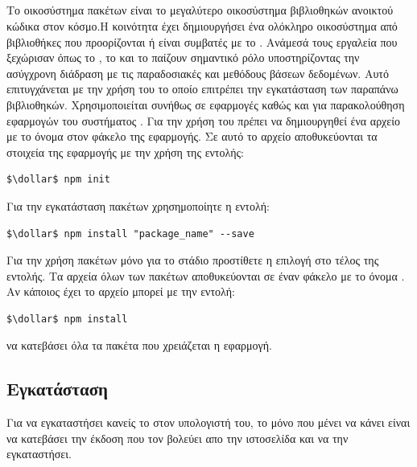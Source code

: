 \subsection*{}
\pSpace Το οικοσύστημα πακέτων  είναι το μεγαλύτερο οικοσύστημα βιβλιοθηκών ανοικτού κώδικα στον κόσμο.Η κοινότητα έχει δημιουργήσει ένα ολόκληρο οικοσύστημα από βιβλιοθήκες που προορίζονται ή είναι συμβατές με το . Ανάμεσά τους εργαλεία που ξεχώρισαν όπως το , το  και το  παίζουν σημαντικό ρόλο υποστηρίζοντας την ασύγχρονη διάδραση με τις παραδοσιακές και  μεθόδους βάσεων δεδομένων. Αυτό επιτυγχάνεται με την χρήση του  το οποίο επιτρέπει την εγκατάσταση των παραπάνω βιβλιοθηκών. Χρησιμοποιείται συνήθως σε εφαρμογές  καθώς και για παρακολούθηση εφαρμογών του συστήματος 
. Για την χρήση του  πρέπει να δημιουργηθεί ένα αρχείο με το όνομα  στον φάκελο της εφαρμογής. Σε αυτό το αρχείο αποθυκεύονται τα στοιχεία της εφαρμογής με την χρήση της εντολής: 
    \begin{lstlisting}[language=command.com]
    $\dollar$ npm init
    \end{lstlisting}
     Για την εγκατάσταση πακέτων χρησημοποίητε η εντολή: 
    \begin{lstlisting}[language=command.com]
    $\dollar$ npm install "package_name" --save
    \end{lstlisting}
     Για την χρήση πακέτων μόνο για το  στάδιο προστίθετε η επιλογή  στο τέλος της εντολής. Τα αρχεία όλων των πακέτων αποθυκεύονται σε έναν φάκελο με το όνομα . Αν κάποιος έχει το αρχείο  μπορεί με την εντολή:
    \begin{lstlisting}[language=command.com]
    $\dollar$ npm install
    \end{lstlisting}
     να κατεβάσει όλα τα πακέτα που χρειάζεται η εφαρμογή.
 
\subsection*{Εγκατάσταση}
\pSpace Για να εγκαταστήσει κανείς το  στον υπολογιστή του, το μόνο που μένει να κάνει είναι να κατεβάσει την έκδοση που τον βολεύει απο την ιστοσελίδα \newline{} και να την εγκαταστήσει. 

